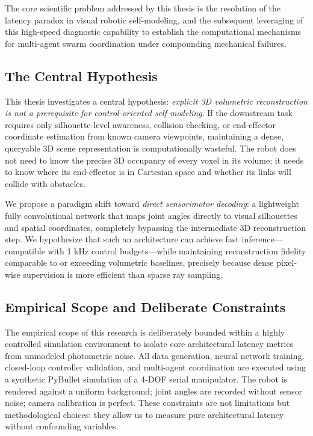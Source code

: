 \documentclass[12pt,a4paper,oneside]{report}
\begin{document}
The core scientific problem addressed by this thesis is the resolution of the latency paradox in visual robotic self-modeling, and the subsequent leveraging of this high-speed diagnostic capability to establish the computational mechanisms for multi-agent swarm coordination under compounding mechanical failures.

\subsection{The Central Hypothesis}
\label{subsec:central_hypothesis}

This thesis investigates a central hypothesis: \textit{explicit 3D volumetric reconstruction is not a prerequisite for control-oriented self-modeling}. If the downstream task requires only silhouette-level awareness, collision checking, or end-effector coordinate estimation from known camera viewpoints, maintaining a dense, queryable 3D scene representation is computationally wasteful. The robot does not need to know the precise 3D occupancy of every voxel in its volume; it needs to know where its end-effector is in Cartesian space and whether its links will collide with obstacles.

We propose a paradigm shift toward \textit{direct sensorimotor decoding}: a lightweight fully convolutional network that maps joint angles directly to visual silhouettes and spatial coordinates, completely bypassing the intermediate 3D reconstruction step. We hypothesize that such an architecture can achieve fast inference—compatible with 1 kHz control budgets—while maintaining reconstruction fidelity comparable to or exceeding volumetric baselines, precisely because dense pixel-wise supervision is more efficient than sparse ray sampling.

\subsection{Empirical Scope and Deliberate Constraints}
\label{subsec:empirical_scope}

The empirical scope of this research is deliberately bounded within a highly controlled simulation environment to isolate core architectural latency metrics from unmodeled photometric noise. All data generation, neural network training, closed-loop controller validation, and multi-agent coordination are executed using a synthetic PyBullet simulation of a 4-DOF serial manipulator. The robot is rendered against a uniform background; joint angles are recorded without sensor noise; camera calibration is perfect. These constraints are not limitations but methodological choices: they allow us to measure pure architectural latency without confounding variables.
\end{document}
